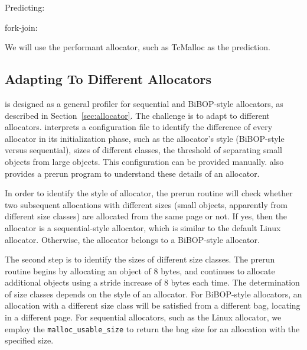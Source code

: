 Predicting: 

fork-join:

We will use the performant allocator, such as TcMalloc as the prediction. 

\subsection{Adapting To Different Allocators}
\label{sec:understandingallocators}

\MP{} is designed as a general profiler for sequential and BiBOP-style allocators, as described in Section~\ref{sec:allocator}. The challenge is to adapt  to different allocators. \MP{} interprets a configuration file to identify the difference of every allocator in its initialization phase, such as the allocator's style (BiBOP-style versus sequential), sizes of different classes, the threshold of separating small objects from large objects. This configuration can be provided manually. \MP{} also provides a prerun program to understand these details of an allocator. 

In order to identify the style of allocator, the prerun routine will check whether two subsequent allocations with different sizes (small objects, apparently from different size classes) are allocated from the same page or not. If yes, then the allocator is a sequential-style allocator, which is similar to the default Linux allocator. Otherwise, the allocator belongs to a BiBOP-style allocator. 

The second step is to identify the sizes of different size classes. The prerun routine begins by allocating an object of 8 bytes, and continues to allocate additional objects using a stride increase of 8 bytes each time. The determination of size classes depends on the style of an allocator. For BiBOP-style allocators, an allocation with a different size class will be satisfied from a different bag, locating in a different page. For sequential allocators, such as the Linux allocator, we employ the \texttt{malloc\_usable\_size} to  return the bag size for an allocation with the specified size. 

